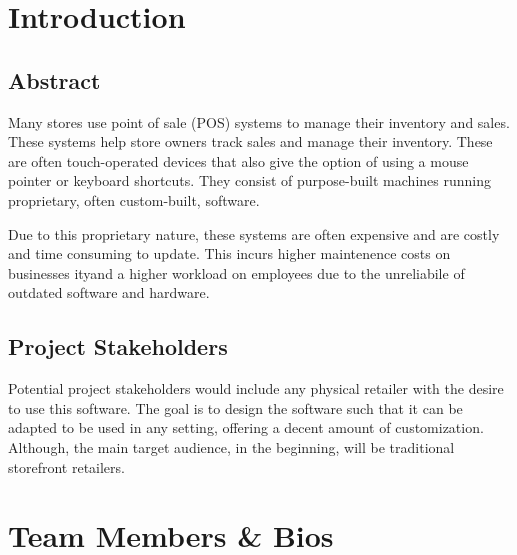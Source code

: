 






\newpage
\tableofcontents
\newpage



\section{Introduction}

\subsection{Abstract}
Many stores use point of sale (POS) systems to manage their inventory and sales.
These systems help store owners track sales and manage their inventory. These
are often touch-operated devices that also give the option of using a mouse
pointer or keyboard shortcuts. They consist of purpose-built machines running
proprietary, often custom-built, software.

Due to this proprietary nature, these systems are often expensive and are costly
and time consuming to update. This incurs higher maintenence costs on businesses
ityand a higher workload on employees due to the unreliabile of outdated software and hardware.

\subsection{Project Stakeholders}
Potential project stakeholders would include any physical retailer with the
desire to use this software. The goal is to design the software such that it can
be adapted to be used in any setting, offering a decent amount of customization. Although, the main
target audience, in the beginning, will be traditional storefront retailers.

\section{Team Members \& Bios}

